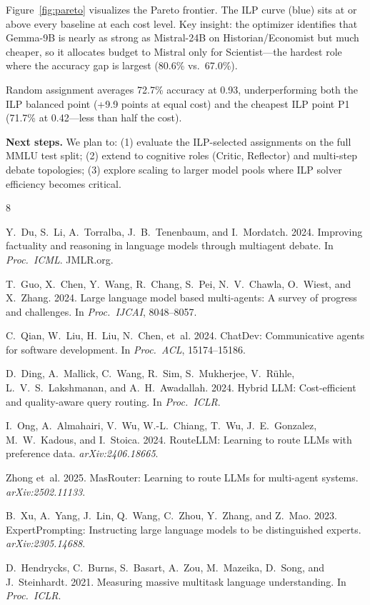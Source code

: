 \documentclass[sigconf,nonacm]{acmart}
\begin{document}
Figure~\ref{fig:pareto} visualizes the Pareto frontier. The ILP curve (blue) sits at or above every baseline at each cost level. Key insight: the optimizer identifies that Gemma-9B is nearly as strong as Mistral-24B on Historian/Economist but much cheaper, so it allocates budget to Mistral only for Scientist---the hardest role where the accuracy gap is largest (80.6\% vs.\ 67.0\%).

Random assignment averages 72.7\% accuracy at 0.93\textcent, underperforming both the ILP balanced point (+9.9 points at equal cost) and the cheapest ILP point P1 (71.7\% at 0.42\textcent---less than half the cost).

\textbf{Next steps.} We plan to: (1) evaluate the ILP-selected assignments on the full MMLU test split; (2) extend to cognitive roles (Critic, Reflector) and multi-step debate topologies; (3) explore scaling to larger model pools where ILP solver efficiency becomes critical.


\begin{thebibliography}{8}
\small

Y.~Du, S.~Li, A.~Torralba, J.~B.~Tenenbaum, and I.~Mordatch. 2024. Improving factuality and reasoning in language models through multiagent debate. In \textit{Proc.\ ICML}. JMLR.org.

T.~Guo, X.~Chen, Y.~Wang, R.~Chang, S.~Pei, N.~V.~Chawla, O.~Wiest, and X.~Zhang. 2024. Large language model based multi-agents: A survey of progress and challenges. In \textit{Proc.\ IJCAI}, 8048--8057.

C.~Qian, W.~Liu, H.~Liu, N.~Chen, et~al. 2024. ChatDev: Communicative agents for software development. In \textit{Proc.\ ACL}, 15174--15186.

D.~Ding, A.~Mallick, C.~Wang, R.~Sim, S.~Mukherjee, V.~R\"{u}hle, L.~V.~S.~Lakshmanan, and A.~H.~Awadallah. 2024. Hybrid LLM: Cost-efficient and quality-aware query routing. In \textit{Proc.\ ICLR}.

I.~Ong, A.~Almahairi, V.~Wu, W.-L.~Chiang, T.~Wu, J.~E.~Gonzalez, M.~W.~Kadous, and I.~Stoica. 2024. RouteLLM: Learning to route LLMs with preference data. \textit{arXiv:2406.18665}.

Zhong et~al. 2025. MasRouter: Learning to route LLMs for multi-agent systems. \textit{arXiv:2502.11133}.

B.~Xu, A.~Yang, J.~Lin, Q.~Wang, C.~Zhou, Y.~Zhang, and Z.~Mao. 2023. ExpertPrompting: Instructing large language models to be distinguished experts. \textit{arXiv:2305.14688}.

D.~Hendrycks, C.~Burns, S.~Basart, A.~Zou, M.~Mazeika, D.~Song, and J.~Steinhardt. 2021. Measuring massive multitask language understanding. In \textit{Proc.\ ICLR}.

\end{thebibliography}
\end{document}
